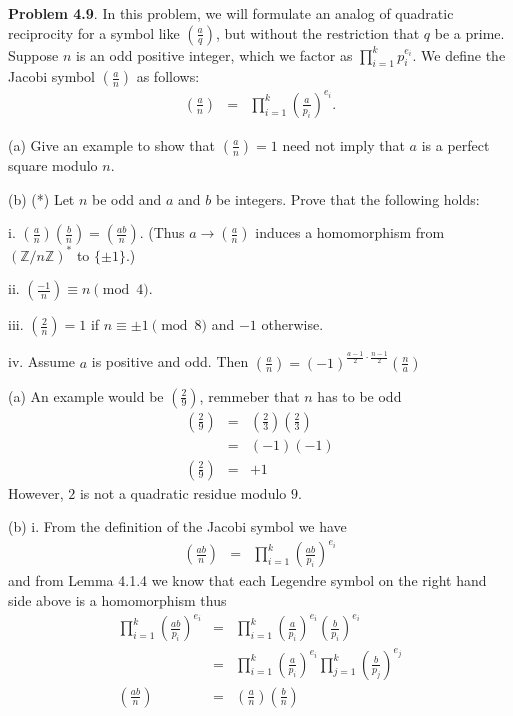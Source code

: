 \documentclass[aps,preprint,preprintnumbers,nofootinbib,showpacs,prd]{revtex4-1}
\newcommand{\nbea}{\begin{eqnarray*}}
\newcommand{\neea}{\end{eqnarray*}}
\begin{document}
{\bf Problem 4.9}. In this problem, we will formulate an analog of quadratic reciprocity for a symbol like $\left( \frac{a} {q} \right )$, but without the restriction that $q$ be a prime. Suppose $n$ is an odd positive integer, which we factor as $\prod^k_{i=1} p_i^{e_i}$. We define the Jacobi symbol $\left (\frac{a}{n}\right )$ as follows: 
%
\nbea
\left ( \frac{a}{n}\right ) & = & \prod_{i=1}^k \left ( \frac{a}{p_i} \right )^{e_i}. 
\neea
%

(a) Give an example to show that $\left ( \frac{a}{n} \right ) = 1$ need not imply that $a$ is a perfect square modulo $n$.

(b) (*) Let $n$ be odd and $a$ and $b$ be integers. Prove that the following holds: 

i. $\left ( \frac{a}{n}\right )\left ( \frac{b}{n}\right )=\left ( \frac{ab}{n}\right )$. (Thus $a \rightarrow \left ( \frac{a}{n}\right )$ induces a homomorphism from $( \mathbb{Z}/n\mathbb{Z})^*$ to $\{\pm1\}$.) 

ii. $\left ( \frac{-1}{n}\right )\equiv n \pmod{4}$.

iii. $\left ( \frac{2}{n}\right ) = 1$ if $n \equiv \pm 1 \pmod{8}$ and $-1$ otherwise.

iv. Assume $a$ is positive and odd. Then $\left ( \frac{a}{n}\right ) = (-1)^{\frac{a-1}{2}\cdot\frac{n-1}{2}} \left (\frac{n}{a} \right ) $

(a) An example would be $\left( \frac{2}{9}\right )$, remmeber that $n$ has to be odd
%
\nbea
\left( \frac{2}{9}\right ) & = & \left( \frac{2}{3}\right ) \left( \frac{2}{3}\right ) \\
& = & (-1)(-1) \\
\left( \frac{2}{9}\right ) & = & +1
\neea
%
However, $2$ is not a quadratic residue modulo $9$.

(b) i. From the definition of the Jacobi symbol we have
%
\nbea
\left ( \frac{ab}{n}\right ) & = & \prod_{i=1}^k \left ( \frac{ab}{p_i} \right )^{e_i}
\neea
%
and from Lemma 4.1.4 we know that each Legendre symbol on the right hand side above is a homomorphism thus 
%
\nbea
\prod_{i=1}^k \left ( \frac{ab}{p_i} \right )^{e_i} & = & \prod_{i=1}^k \left ( \frac{a}{p_i} \right )^{e_i} \left ( \frac{b}{p_i} \right )^{e_i} \\
& = & \prod_{i=1}^k \left ( \frac{a}{p_i} \right )^{e_i} \prod_{j=1}^k \left ( \frac{b}{p_j} \right )^{e_j} \\
\left ( \frac{ab}{n}\right ) & = & \left ( \frac{a}{n}\right )\left ( \frac{b}{n}\right )
\neea
%
\end{document}
